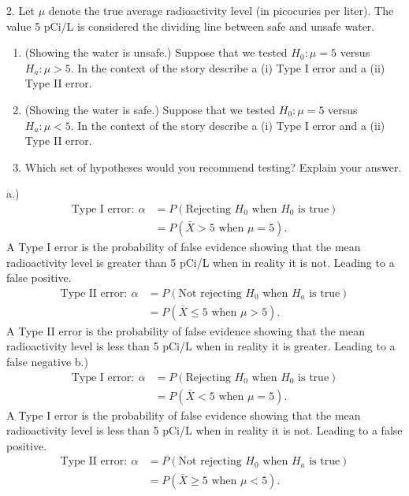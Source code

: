 \documentclass{report}
\begin{document}
\pagebreak \bigbreak \noindent 
\begin{mdframed}
2. Let $\mu$ denote the true average radioactivity level (in picocuries per liter). The value 5 pCi/L is considered the dividing line between safe and unsafe water.
    \begin{enumerate}[label=(\alph*)]
        \item (Showing the water is unsafe.) Suppose that we tested $H_0: \mu = 5$ versus $H_a: \mu > 5$. In the context of the story describe a (i) Type I error and a (ii) Type II error.
        \item (Showing the water is safe.) Suppose that we tested $H_0: \mu = 5$ versus $H_a: \mu < 5$. In the context of the story describe a (i) Type I error and a (ii) Type II error.
        \item Which set of hypotheses would you recommend testing? Explain your answer.
    \end{enumerate}
\end{mdframed}
\bigbreak \noindent 
a.)
\begin{align*}
    \text{Type I error}:\ \alpha &= P(\text{Rejecting $H_{0}$ when $H_{0}$ is true}) \\
                                 &=P(\bar{X} > 5 \text{ when } \mu = 5)
.\end{align*}
A Type I error is the probability of false evidence showing that the mean radioactivity level is greater than 5 pCi/L when in reality it is not. Leading to a false positive.
\begin{align*}
    \text{Type II error}:\ \alpha &= P(\text{Not rejecting $H_{0}$ when $H_{a}$ is true}) \\
                                 &=P(\bar{X} \leq 5 \text{ when } \mu > 5)
.\end{align*}
\bigbreak \noindent 
A Type II error is the probability of false evidence showing that the mean radioactivity level is less than 5 pCi/L when in reality it is greater. Leading to a false negative
\bigbreak \noindent 
b.)
\begin{align*}
    \text{Type I error}:\ \alpha &= P(\text{Rejecting $H_{0}$ when $H_{0}$ is true}) \\
                                 &=P(\bar{X} < 5 \text{ when } \mu = 5)
.\end{align*}
A Type I error is the probability of false evidence showing that the mean radioactivity level is less than 5 pCi/L when in reality it is not. Leading to a false positive.
\begin{align*}
    \text{Type II error}:\ \alpha &= P(\text{Not rejecting $H_{0}$ when $H_{a}$ is true}) \\
                                 &=P(\bar{X}  \geq 5 \text{ when } \mu < 5)
.\end{align*}
\end{document}
